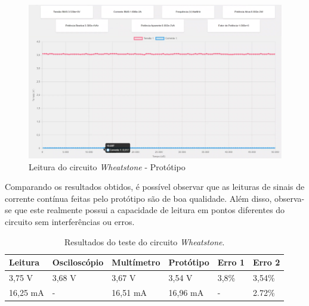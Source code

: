 \begin{figure}[htb!]
    \caption{Leitura do circuito \textit{Wheatstone} - Protótipo}
    \label{fig:wheatstone-boy}
    \includegraphics[width=1\textwidth]{figuras/wheatstone-boy.png}
    \fonte{}
\end{figure}

Comparando os resultados obtidos, é possível observar que as leituras de sinais de corrente contínua feitas pelo protótipo são de boa qualidade. Além disso, observa-se que este realmente possui a capacidade de leitura em pontos diferentes do circuito sem interferências ou erros.

\begin{table}[!ht]
    \centering
    \caption{Resultados do teste do circuito \textit{Wheatstone}.}
    \label{tab:resultados-wheatstone}
    \begin{tabular}{ l l l l l l }
        \hline
        \textbf{Leitura} & \textbf{Osciloscópio} & \textbf{Multímetro} & \textbf{Protótipo}    & \textbf{Erro 1}  & \textbf{Erro 2}   \\ \hline
        3,75 V           & 3,68 V                & 3,67 V              & 3,54 V                & 3,8\%            & 3,54\%            \\ 
        16,25 mA         & -                     & 16,51 mA            & 16,96 mA              & -                & 2.72\%            \\ \hline
    \end{tabular}
    \fonte{}
\end{table}